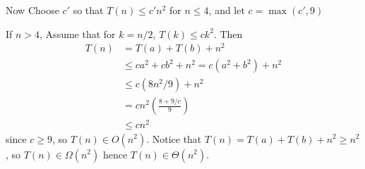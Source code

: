 \documentclass[12pt, a4paper]{article}
\begin{document}
\begin{enumerate}
    Now Choose $c'$ so that
    $T(n) \leq c' n^2$ for $n \leq 4$, and let $ c = \max(c', 9 ) $
    
    If $n > 4$, Assume that for $k = n/2$, $T(k) \leq c k^2$. Then
    \begin{align*}
      T(n) &= T(a) + T(b) + n^2  \\
      & \leq c a^2 + c b^2 + n^2 = c (a^2 + b^2) + n^2 \\
      & \leq c\left(8n^2 / 9\right) + n^2 \\
      & = cn^2 \left(\frac{8 + 9/c}{9}\right) \\
      & \leq c n^2
    \end{align*}
    since $c \geq 9$, so $T(n) \in O(n^2)$. Notice that $T(n) = T(a) + T(b) + n^2 \geq n^2$, so
    $T(n) \in \Omega(n^2)$ hence $T(n) \in \Theta(n^2)$.


  
\end{enumerate}
\end{document}
